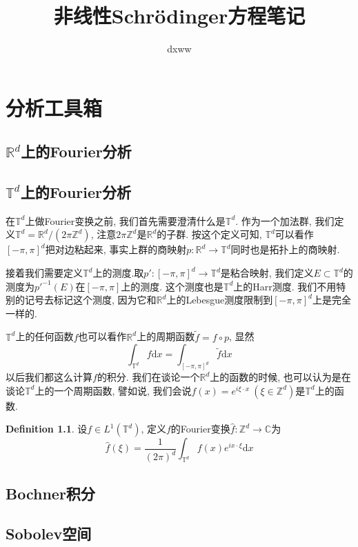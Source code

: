 \documentclass{ctexbook}
\title{非线性Schr\"odinger方程笔记}
\author{dxww}
\theoremstyle{definition}
\newtheorem{definition}{Definition}[section]
\theoremstyle{remark}
\newcommand{\dif}{\mathrm{d}}
\begin{document}
\maketitle
\tableofcontents

\chapter{分析工具箱}
\section{$\mathbb{R}^d$上的Fourier分析}
\section{$\mathbb{T}^d$上的Fourier分析}
在$\mathbb{T}^d$上做Fourier变换之前, 我们首先需要澄清什么是$\mathbb{T}^d$. 作为一个加法群, 我们定义$\mathbb{T}^d=\mathbb{R}^d/(2\pi\mathbb{Z}^d)$, 注意$2\pi\mathbb{Z}^d$是$\mathbb{R}^d$的子群. 按这个定义可知, $\mathbb{T}^d$可以看作$[-\pi,\pi]^d$把对边粘起来, 事实上群的商映射$p:\mathbb{R}^d\rightarrow\mathbb{T}^d$同时也是拓扑上的商映射. 

接着我们需要定义$\mathbb{T}^d$上的测度.取$p':[-\pi,\pi]^d\rightarrow\mathbb{T}^d$是粘合映射, 我们定义$E\subset\mathbb{T}^d$的测度为$p'^{-1}(E)$在$[-\pi,\pi]$上的测度. 这个测度也是$\mathbb{T}^d$上的Harr测度. 我们不用特别的记号去标记这个测度, 因为它和$\mathbb{R}^d$上的Lebesgue测度限制到$[-\pi,\pi]^d$上是完全一样的. 

$\mathbb{T}^d$上的任何函数$f$也可以看作$\mathbb{R}^d$上的周期函数$\tilde{f}=f\circ p$, 显然
$$\int_{\mathbb{T}^d}f\dif x=\int_{[-\pi,\pi]^d}\tilde{f}\dif x$$
以后我们都这么计算$f$的积分. 我们在谈论一个$\mathbb{R}^d$上的函数的时候, 也可以认为是在谈论$\mathbb{T}^d$上的一个周期函数, 譬如说, 我们会说$f(x)=e^{i\xi\cdot x}\ (\xi\in\mathbb{Z}^d)$是$\mathbb{T}^d$上的函数. 

\begin{definition}
设$f\in L^1(\mathbb{T}^d)$, 定义$f$的Fourier变换$\widehat{f}:\mathbb{Z}^d\rightarrow\mathbb{C}$为
$$\widehat{f}(\xi)=\frac{1}{(2\pi)^d}\int_{\mathbb{T}^d}f(x)e^{ix\cdot\xi}\dif x$$
\end{definition}
\section{Bochner积分}
\section{Sobolev空间}
\end{document}
